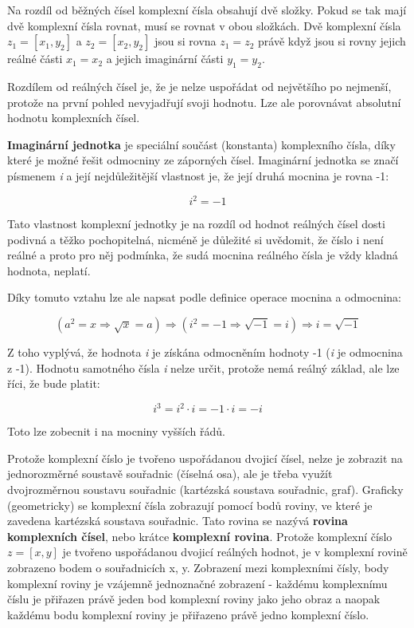 Na rozdíl od běžných čísel komplexní čísla obsahují dvě složky. Pokud se tak mají dvě komplexní čísla rovnat, musí se rovnat v obou složkách. Dvě komplexní čísla $z_1=[x_1,y_2]$ a $z_2=[x_2,y_2]$ jsou si rovna $ z_1=z_2$ právě když jsou si rovny jejich reálné části $x_1=x_2$ a jejich imaginární části $y_1 = y_2$. 

Rozdílem od reálných čísel je, že je nelze uspořádat od největšího po nejmenší, protože na první pohled nevyjadřují svoji hodnotu. Lze ale porovnávat absolutní hodnotu komplexních čísel.


{\bf Imaginární jednotka} je speciální součást (konstanta) komplexního čísla, díky které je možné řešit odmocniny ze záporných čísel. Imaginární jednotka se značí písmenem {\it i} a její nejdůležitější vlastnost je,  že její druhá mocnina je rovna -1: 

$$ i^2 =-1$$

Tato vlastnost komplexní jednotky je na rozdíl od hodnot reálných čísel dosti podivná a těžko pochopitelná, nicméně je důležité si uvědomit, že číslo i není reálné a proto pro něj podmínka, že sudá mocnina reálného čísla je vždy kladná hodnota, neplatí.

Díky tomuto vztahu lze ale napsat podle definice operace mocnina a odmocnina:

$$(a^2=x\Rightarrow\sqrt{x}=a)\Rightarrow (i^2=-1 \Rightarrow \sqrt{-1}=i) \Rightarrow i=\sqrt{-1} $$

Z toho vyplývá, že hodnota {\it i} je získána odmocněním hodnoty -1 ({\it i} je odmocnina z -1). Hodnotu samotného čísla {\it i} nelze určit, protože nemá reálný základ, ale lze říci, že bude platit:

$$ i^3 = i^2 \cdot i = -1 \cdot i = -i $$

Toto lze zobecnit i na mocniny vyšších řádů.


Protože komplexní číslo je tvořeno uspořádanou dvojicí čísel, nelze je zobrazit na jednorozměrné soustavě souřadnic (číselná osa), ale je třeba využít dvojrozměrnou soustavu souřadnic (kartézská soustava souřadnic, graf). Graficky (geometricky) se komplexní čísla zobrazují pomocí bodů roviny, ve které je zavedena kartézská soustava souřadnic. Tato rovina se nazývá {\bf rovina komplexních čísel}, nebo krátce {\bf komplexní rovina}. Protože komplexní číslo $z=[x,y] $ je tvořeno uspořádanou dvojicí reálných hodnot, je v komplexní rovině zobrazeno bodem o souřadnicích x, y. Zobrazení mezi komplexními čísly, body komplexní roviny je vzájemně jednoznačné zobrazení - každému komplexnímu číslu je přiřazen právě jeden bod komplexní roviny jako jeho obraz a naopak každému bodu komplexní roviny je přiřazeno právě jedno komplexní číslo. 

